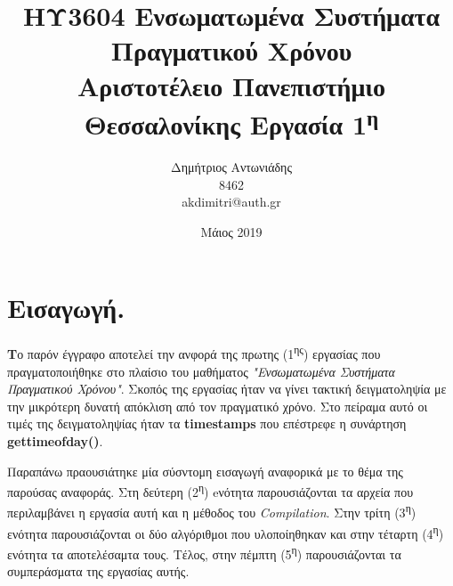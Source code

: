\documentclass[12pt, a4paper]{article}
\title{{ΗΥ3604 Ενσωματωμένα Συστήματα Πραγματικού Χρόνου}\\
{\large Αριστοτέλειο Πανεπιστήμιο Θεσσαλονίκης}\newline \newline
{Εργασία 1\textsuperscript{η}}}
\author{Δημήτριος Αντωνιάδης\\8462
\\\textlatin{akdimitri@auth.gr}}
\date{Μάιος 2019}
\begin{document}
\maketitle

\newpage

\tableofcontents

\newpage

\section{Εισαγωγή.}
\justify
\textbf{Τ}ο παρόν έγγραφο αποτελεί την ανφορά της πρωτης (1\textsuperscript{ης}) εργασίας που πραγματοποιήθηκε στο πλαίσιο του μαθήματος \textit{"Ενσωματωμένα Συστήματα Πραγματικού Χρόνου"}. Σκοπός της εργασίας ήταν να γίνει τακτική δειγματοληψία με την μικρότερη δυνατή απόκλιση από τον
πραγματικό χρόνο. Στο πείραμα αυτό οι τιμές της δειγματοληψίας ήταν τα \textlatin{\textbf{timestamps}} που επέστρεφε η συνάρτηση \textlatin{\textbf{gettimeofday()}}\cite{manual}.

\justify
Παραπάνω πραουσιάτηκε μία σύσντομη εισαγωγή αναφορικά με το θέμα της παρούσας αναφοράς. Στη δεύτερη (2\textsuperscript{η}) eνότητα παρουσιάζονται τα αρχεία που περιλαμβάνει η εργασία αυτή και η μέθοδος του \textit{\textlatin{Compilation}}. Στην τρίτη (3\textsuperscript{η}) ενότητα παρουσιάζονται οι δύο αλγόριθμοι που υλοποίηθηκαν και στην τέταρτη (4\textsuperscript{η}) ενότητα τα αποτελέσαμτα τους. Τέλος, στην πέμπτη (5\textsuperscript{η}) παρουσιάζονται τα συμπεράσματα της εργασίας αυτής.


\end{document}
